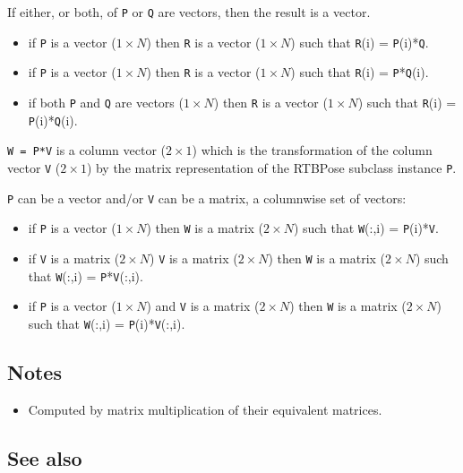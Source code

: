 If either, or both, of \texttt{P} or \texttt{Q} are vectors, then the result is a vector.

\begin{itemize}
  \item if \texttt{P} is a vector ($1 \times N$) then \texttt{R} is a vector ($1 \times N$) such that \texttt{R}(i) = \texttt{P}(i)*\texttt{Q}.
  \item if \texttt{P} is a vector ($1 \times N$) then \texttt{R} is a vector ($1 \times N$) such that \texttt{R}(i) = \texttt{P}*\texttt{Q}(i).
  \item if both \texttt{P} and \texttt{Q} are vectors ($1 \times N$) then \texttt{R} is a vector ($1 \times N$) such     that \texttt{R}(i) = \texttt{P}(i)*\texttt{Q}(i).
\end{itemize}


\texttt{W = P*V} is a column vector ($2 \times 1$) which is the transformation of the
column vector \texttt{V} ($2 \times 1$) by the matrix representation of the RTBPose
subclass instance \texttt{P}.



\texttt{P} can be a vector and/or \texttt{V} can be a matrix, a columnwise set of vectors:

\begin{itemize}
  \item if \texttt{P} is a vector ($1 \times N$) then \texttt{W} is a matrix ($2 \times N$) such that \texttt{W}(:,i) = \texttt{P}(i)*\texttt{V}.
  \item if \texttt{V} is a matrix ($2 \times N$) \texttt{V} is a matrix ($2 \times N$) then \texttt{W} is a matrix ($2 \times N$) such     that \texttt{W}(:,i) = \texttt{P}*\texttt{V}(:,i).
  \item if \texttt{P} is a vector ($1 \times N$) and \texttt{V} is a matrix ($2 \times N$) then \texttt{W} is a matrix ($2 \times N$)     such that \texttt{W}(:,i) = \texttt{P}(i)*\texttt{V}(:,i).
\end{itemize}

\subsection*{Notes}
\begin{itemize}
  \item Computed by matrix multiplication of their equivalent matrices.
\end{itemize}

\subsection*{See also}


